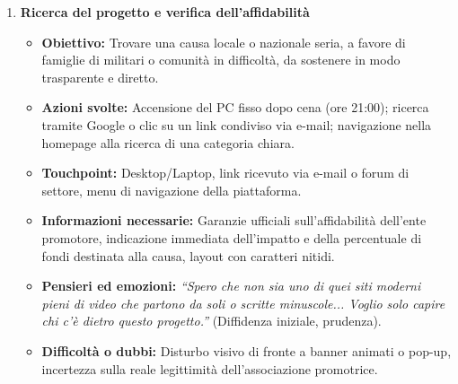 \documentclass[11pt,a4paper]{article}
\begin{document}
    \begin{enumerate}

        \item \textbf{Ricerca del progetto e verifica dell'affidabilità}
        \begin{itemize}
            \item \textbf{Obiettivo:} Trovare una causa locale o nazionale seria, a favore di famiglie di militari o comunità in difficoltà, da sostenere in modo trasparente e diretto.
            \item \textbf{Azioni svolte:} Accensione del PC fisso dopo cena (ore 21:00); ricerca tramite Google o clic su un link condiviso via e-mail; navigazione nella homepage alla ricerca di una categoria chiara.
            \item \textbf{Touchpoint:} Desktop/Laptop, link ricevuto via e-mail o forum di settore, menu di navigazione della piattaforma.
            \item \textbf{Informazioni necessarie:} Garanzie ufficiali sull'affidabilità dell'ente promotore, indicazione immediata dell'impatto e della percentuale di fondi destinata alla causa, layout con caratteri nitidi.
            \item \textbf{Pensieri ed emozioni:} \textit{``Spero che non sia uno di quei siti moderni pieni di video che partono da soli o scritte minuscole... Voglio solo capire chi c'è dietro questo progetto.''} (Diffidenza iniziale, prudenza).
            \item \textbf{Difficoltà o dubbi:} Disturbo visivo di fronte a banner animati o pop-up, incertezza sulla reale legittimità dell'associazione promotrice.
        \end{itemize}


\end{enumerate}
\end{document}
